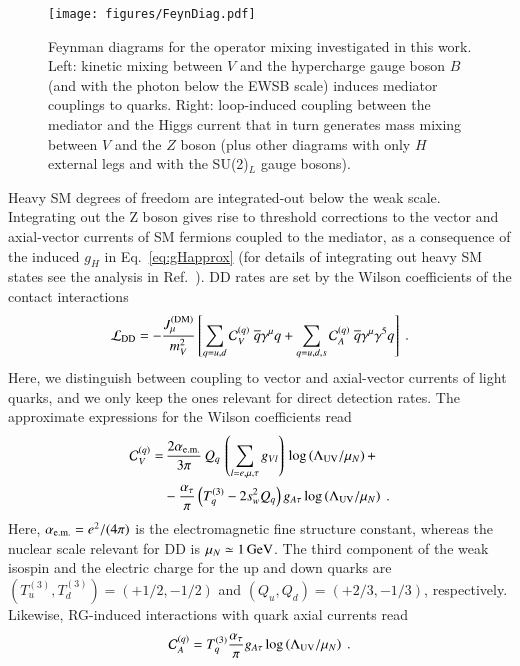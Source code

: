 \documentclass[final,5p,twocolumn]{elsarticle}
\newcommand{\be}{\begin{equation}}
\newcommand{\ee}{\end{equation}}
\newcommand{\Eq}[1]{Eq.~\eqref{#1}}
\newcommand{\Ref}[1]{Ref.~\cite{#1}}
\begin{document}
\begin{figure}[t!]
\centering
{\texttt{[image: figures/FeynDiag.pdf]}}
\caption{Feynman diagrams for the operator mixing investigated in this work. Left: kinetic mixing between $V$ and the hypercharge gauge boson $B$ (and with the photon below the EWSB scale) induces mediator couplings to quarks. Right: loop-induced coupling between the mediator and the Higgs current that in turn generates mass mixing between $V$ and the $Z$ boson (plus other diagrams with only $H$ external legs and with the SU(2)$_L$ gauge bosons).}
\label{fig:FeynDiag}
\end{figure}

Heavy SM degrees of freedom are integrated-out below the weak scale. Integrating out the Z boson gives rise to threshold corrections to the vector and axial-vector currents of SM fermions coupled to the mediator, as a consequence of the induced $g_H$ in \Eq{eq:gHapprox} (for details of integrating out heavy SM states see the analysis in \Ref{D'Eramo:2014aba}). DD rates are set by the Wilson coefficients of the contact interactions
\be
\mathcal{L}_{\rm DD} = - \frac{J_\mu^{\rm (DM)}}{m_V^2}  
\left[ \sum_{q = u, d} \mathcal{C}_{V}^{(q)} \; \overline{q} \gamma^\mu q + 
\sum_{q = u, d, s} \mathcal{C}_{A}^{(q)} \; \overline{q} \gamma^\mu \gamma^5 q \right] \ .
\label{eq:LagDD}
\ee
Here, we distinguish between coupling to vector and axial-vector currents of light quarks, and we only keep the ones relevant for direct detection rates. The approximate expressions for the Wilson coefficients read
\begin{align}
\label{eq:CVq} \mathcal{C}_{V}^{(q)} =  & \, \frac{2 \alpha_{\rm e.m.}}{3 \pi} \, Q_q \,  \left( \sum_{l = e, \mu, \tau} g_{V l} \right) \,
\log\left(\Lambda_{\rm UV} / \mu_N\right) + \\ & \nonumber
 -  \frac{\alpha_\tau}{\pi} \left(T^{(3)}_q - 2 s_w^2 Q_q \right) g_{A \tau} \log\left(\Lambda_{\rm UV} / \mu_N\right)  \ .
\end{align}
Here, $\alpha_{\rm e.m.} = e^2 / (4 \pi)$ is the electromagnetic fine structure constant, whereas the nuclear scale relevant for DD is $\mu_N \simeq 1 \, {\rm GeV}$. The third component of the weak isospin and the electric charge for the up and down quarks are $(T^{(3)}_u, T^{(3)}_d) = ( + 1/2, -1/2)$ and $(Q_u, Q_d) = ( + 2/3, -1/3)$, respectively. Likewise, RG-induced interactions with quark axial currents read
\be
\mathcal{C}_{A}^{(q)} = T^{(3)}_q \frac{\alpha_\tau}{\pi} g_{A \tau} \log\left(\Lambda_{\rm UV} / \mu_N\right)  \ .
\label{eq:CAq}
\ee
\end{document}
